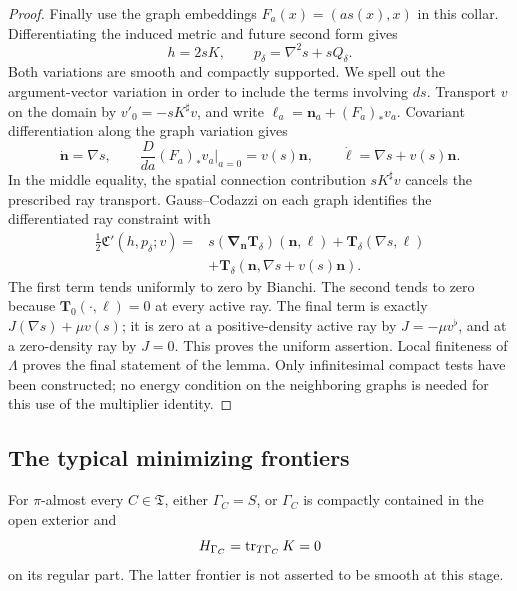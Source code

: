 \begin{proof}
Finally use the graph embeddings $F_a(x)=(a s(x),x)$ in this collar.
Differentiating the induced metric and future second form gives
\[
 h=2sK,\qquad p_\delta=\nabla^2s+sQ_\delta.
\]
Both variations are smooth and compactly supported.  We spell out the
argument-vector variation in order to include the terms involving
$ds$.  Transport $v$ on the domain by $v'_0=-sK^\sharp v$, and write
$\ell_a=\mathbf n_a+(F_a)_*v_a$.  Covariant differentiation along the
graph variation gives
\[
 \dot{\mathbf n}=\nabla s,\qquad
 \frac{D}{da}(F_a)_*v_a\bigg|_{a=0}=v(s)\mathbf n,
 \qquad \dot\ell=\nabla s+v(s)\mathbf n.
\]
In the middle equality, the spatial connection contribution
$sK^\sharp v$ cancels the prescribed ray transport.
Gauss--Codazzi on each graph identifies the differentiated ray
constraint with
\[
 \begin{split}
 \tfrac12\mathfrak C'(h,p_\delta;v)
  ={}&s(\boldsymbol\nabla_{\mathbf n}\mathbf T_\delta)
                      (\mathbf n,\ell)
       +\mathbf T_\delta(\nabla s,\ell)\\
     &+\mathbf T_\delta(\mathbf n,\nabla s+v(s)\mathbf n).
 \end{split}
\]
The first term tends uniformly to zero by Bianchi.  The second tends
to zero because $\mathbf T_0(\cdot,\ell)=0$ at every active ray.
The final term is exactly $J(\nabla s)+\mu v(s)$; it is zero at a
positive-density active ray by $J=-\mu v^\flat$, and at a zero-density
ray by $J=0$.  This proves the uniform assertion.  Local finiteness of
$\Lambda$ proves the final statement of the lemma.  Only infinitesimal
compact tests have been constructed; no energy condition on the
neighboring graphs is needed for this use of the multiplier identity.
\end{proof}




\subsection{The typical minimizing frontiers}

\begin{lemma}
\label{lem:variation:contact-dichotomy}
For $\pi$-almost every $C\in\mathfrak T$, either $\Gamma_C=S$, or
$\Gamma_C$ is compactly contained in the open exterior and
\begin{equation}\label{eq:variation:three-equations}
 H_{\Gamma_C}=\operatorname{tr}_{T\Gamma_C}K=0
\end{equation}
on its regular part.  The latter frontier is not asserted to be smooth
at this stage.
\end{lemma}

